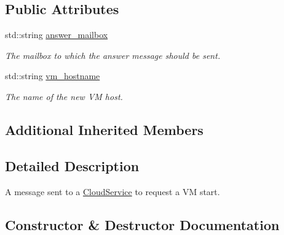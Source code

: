 \subsection*{Public Attributes}
\begin{DoxyCompactItemize}
\item 
\mbox{\label{classwrench_1_1_cloud_service_start_v_m_request_message_ad118c9c44adeab5d20e36884437931d9}} 
std\+::string \hyperlink{classwrench_1_1_cloud_service_start_v_m_request_message_ad118c9c44adeab5d20e36884437931d9}{answer\+\_\+mailbox}
\begin{DoxyCompactList}\small\item\em The mailbox to which the answer message should be sent. \end{DoxyCompactList}\item 
\mbox{\label{classwrench_1_1_cloud_service_start_v_m_request_message_aefd63dd24deca7f6940db2c006d07557}} 
std\+::string \hyperlink{classwrench_1_1_cloud_service_start_v_m_request_message_aefd63dd24deca7f6940db2c006d07557}{vm\+\_\+hostname}
\begin{DoxyCompactList}\small\item\em The name of the new VM host. \end{DoxyCompactList}\end{DoxyCompactItemize}
\subsection*{Additional Inherited Members}


\subsection{Detailed Description}
A message sent to a \hyperlink{classwrench_1_1_cloud_service}{Cloud\+Service} to request a VM start. 

\subsection{Constructor \& Destructor Documentation}
\mbox{\label{classwrench_1_1_cloud_service_start_v_m_request_message_ad5d57439b0557fb513e8918719426d19}} 
